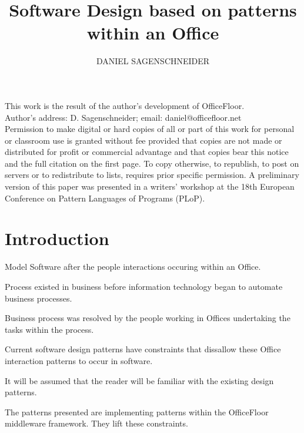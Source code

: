 \documentclass[prodmode]{style/acmlarge}
\title{Software Design based on patterns within an Office}
\author{DANIEL SAGENSCHNEIDER \affil{OfficeFloor, daniel@officefloor.net}}
\begin{document}
\graphicspath{{./pdf/}}

\lstset{language=Java}

\captionsetup[lstlisting]{font=footnotesize}


\begin{bottomstuff}
This work is the result of the author's development of OfficeFloor.\\
Author's address: D. Sagenschneider; email: daniel@officefloor.net\\

Permission to make digital or hard copies of all or part of this work for
personal or classroom use is granted without fee provided that copies are not
made or distributed for profit or commercial advantage and that copies bear this
notice and the full citation on the first page. To copy otherwise, to republish,
to post on servers or to redistribute to lists, requires prior specific
permission. A preliminary version of this paper was presented in a writers'
workshop at the 18th European Conference on Pattern Languages of Programs
(PLoP).
\end{bottomstuff}

\maketitle



\section{Introduction}

Model Software after the people interactions occuring within an Office.

Process existed in business before information technology began to automate business processes.

Business process was resolved by the people working in Offices undertaking the tasks within the process.

Current software design patterns have constraints that dissallow these Office interaction patterns to occur in software.

It will be assumed that the reader will be familiar with the existing design patterns.

The patterns presented are implementing patterns within the OfficeFloor middleware framework.  They lift these constraints.
\end{document}
